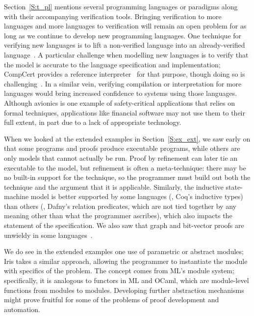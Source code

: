 Section~\ref{S:t_pl} mentions several programming languages or paradigms along
with their accompanying verification tools. Bringing verification to more
languages and more languages to verification will remain an open problem for as
long as we continue to develop new programming languages. One technique for
verifying new languages is to lift a non-verified language into an
already-verified language~\cite{leino2008specification}. A particular challenge
when modelling new languages is to verify that the model is accurate to the
language specification and implementation; CompCert provides a reference
interpreter~\cite{Kastner-LBSSF-2017} for that purpose, though doing so is
challenging~\cite[Chs.\ \emph{Simple Imperative Programs}, \emph{An Evaluation
Function for Imp}]{Pierce:SF1}. In a similar vein, verifying compilation or
interpretation for more languages would bring increased confidence to systems
using those languages. Although avionics is one example of safety-critical
applications that relies on formal techniques, applications like financial
software may not use them to their full extent, in part due to a lack of
appropriate technology.

When we looked at the extended examples in Section~\ref{S:ex_ext}, we saw early
on that some programs and proofs produce executable programs, while others are
only models that cannot actually be run. Proof by refinement can later tie an
executable to the model, but refinement is often a meta-technique: there may be
no built-in support for the technique, so the programmer must build out both the
technique and the argument that it is applicable. Similarly, the inductive
state-machine model is better supported by some languages (\eg, Coq's inductive
types) than others (\eg, Dafny's relation predicates, which are not tied
together by any meaning other than what the programmer ascribes), which also
impacts the statement of the specification. We also saw that graph and
bit-vector proofs are unwieldy in some languages~\cite{Morrisett_2012}.

We do see in the extended examples one use of parametric or abstract modules;
Iris takes a similar approach, allowing the programmer to instantiate the module
with specifics of the problem. The concept comes from ML's module system;
specifically, it is analogous to functors in ML and OCaml, which are
module-level functions from modules to modules. Developing further abstraction
mechanisms might prove fruitful for some of the problems of proof development
and automation.


